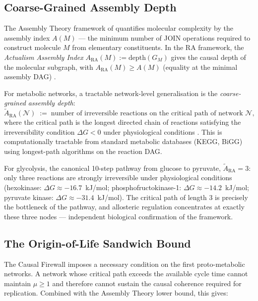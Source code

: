 \documentclass[11pt,a4paper]{article}
\theoremstyle{plain}
\theoremstyle{definition}
\theoremstyle{remark}
\newcommand{\ARA}{A_{\mathrm{RA}}}
\newcommand{\tARA}{\tilde{A}_{\mathrm{RA}}}
\begin{document}
\subsection{Coarse-Grained Assembly Depth}

The Assembly Theory framework of \citet{Murray2023} quantifies molecular
complexity by the assembly index $A(M)$ --- the minimum number of JOIN
operations required to construct molecule $M$ from elementary constituents.
In the RA framework, the \emph{Actualism Assembly Index} $\ARA(M) :=
\mathrm{depth}(G_M)$ gives the causal depth of the molecular subgraph,
with $\ARA(M) \geq A(M)$ (equality at the minimal assembly DAG)
\citep{Sandeman2026RAHC}.

For metabolic networks, a tractable network-level generalisation is the
\emph{coarse-grained assembly depth}:
\begin{equation}
  \tARA(\mathcal{N}) \;:=\; \text{number of irreversible reactions on
  the critical path of network } \mathcal{N},
  \label{eq:tara}
\end{equation}
where the critical path is the longest directed chain of reactions satisfying
the irreversibility condition $\Delta G < 0$ under physiological conditions
\citep{Sandeman2026RAHC}. This is computationally tractable from standard
metabolic databases (KEGG, BiGG) using longest-path algorithms on the
reaction DAG.

For glycolysis, the canonical 10-step pathway from glucose to pyruvate,
$\tARA = 3$: only three reactions are strongly irreversible under physiological
conditions (hexokinase: $\Delta G \approx -16.7$~kJ/mol; phosphofructokinase-1:
$\Delta G \approx -14.2$~kJ/mol; pyruvate kinase: $\Delta G \approx
-31.4$~kJ/mol). The critical path of length 3 is precisely the bottleneck
of the pathway, and allosteric regulation concentrates at exactly these
three nodes --- independent biological confirmation of the framework.

\subsection{The Origin-of-Life Sandwich Bound}

The Causal Firewall imposes a necessary condition on the first proto-metabolic
networks. A network whose critical path exceeds the available cycle time cannot
maintain $\mu \geq 1$ and therefore cannot sustain the causal coherence required
for replication. Combined with the Assembly Theory lower bound, this gives:
\end{document}
